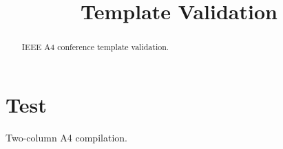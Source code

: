 \documentclass[a4paper,conference]{IEEEtran}
\begin{document}
\title{Template Validation}\author{}
\maketitle
\begin{abstract}IEEE A4 conference template validation.\end{abstract}
\section{Test}Two-column A4 compilation.
\end{document}
